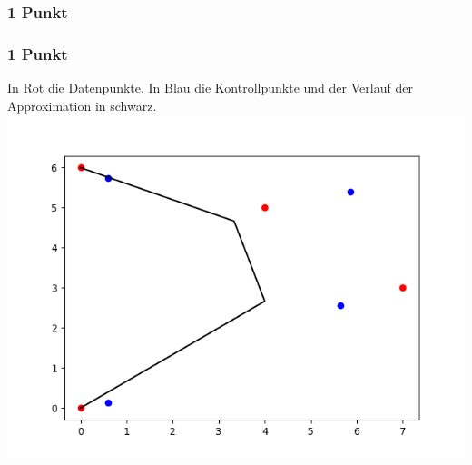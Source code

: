 \subsubsection{1 Punkt}
\begin{center}
\end{center}
\subsubsection{1 Punkt}
In Rot die Datenpunkte.
In Blau die Kontrollpunkte
und der Verlauf der Approximation in schwarz.\\
\includegraphics[width=\textwidth]{3d}
